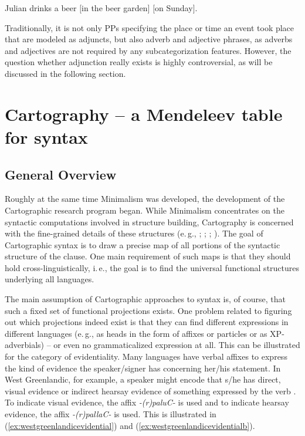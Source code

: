 \begin{exe}
\ex\label{simpleargumentsoftheverbbb} Julian drinks a beer $[$in the beer garden$]$ $[$on Sunday$]$.
\end{exe}

\noindent Traditionally, it is not only PPs specifying the place or time an event took place that are modeled as adjuncts, but also adverb and adjective phrases, as adverbs and adjectives are not required by any subcategorization features.  However, the question whether adjunction really exists is highly controversial, as will be discussed in the following section.
\label{generaladjunctionb}


\section{Cartography -- a Mendeleev table for syntax}\label{cartographicenterprise}\label{theoryintrob}
\subsection{General Overview}
Roughly at the same time Minimalism was developed, the development of the Cartographic research program began. While Minimalism concentrates on the syntactic computations involved in structure building, Cartography is concerned with the fine-grained details of these structures (e.\,g., \citealt{cinque1999adverbs}; \citealt{rizzi2004cartography}; \citealt{belletti2008structures}; \citealt{cinque2008cartography}). The goal of Cartographic syntax is to draw a precise map of all portions of the syntactic structure of the clause. One main requirement of such maps is that they should hold cross-linguistically, i.\,e., the goal is to find the universal functional structures underlying all languages. 

The main assumption of Cartographic approaches to syntax is, of course, that such a fixed set of functional projections exists. One problem related to figuring out which projections indeed exist is that they can find different expressions in different languages (e.\,g., as heads in the form of affixes or particles or as XP-adverbials) -- or even no grammaticalized expression at all. This can be illustrated for the category of evidentiality. Many languages have verbal affixes to express the kind of evidence the speaker/signer has concerning her/his statement. In West Greenlandic, for example, a speaker might encode that s/he has direct, visual evidence or indirect hearsay evidence of something expressed by the verb \citep{fortescue2003evidentiality}. To indicate visual evidence, the affix \textit{-(r)paluC-} is used and to indicate hearsay evidence, the affix \textit{-(r)pallaC-} is used. This is illustrated in (\ref{ex:westgreenlandicevidential}) and (\ref{ex:westgreenlandicevidentialb}).

